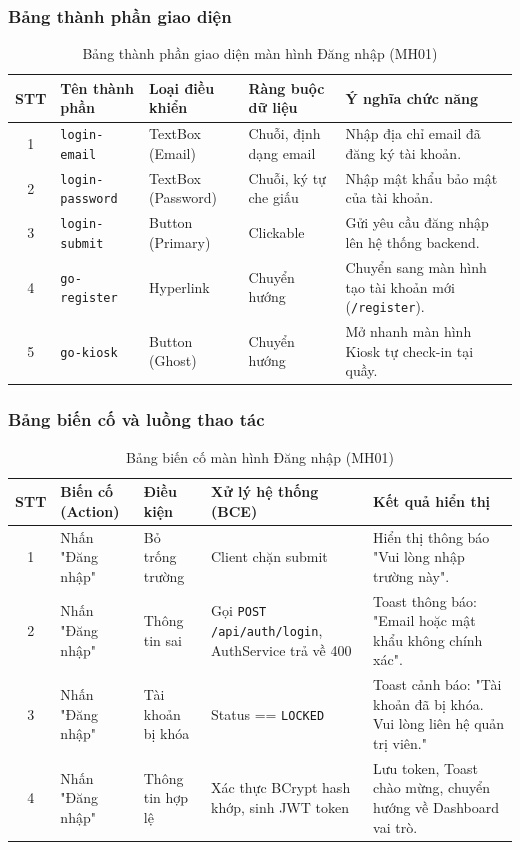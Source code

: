 \documentclass[12pt,a4paper]{report}
\begin{document}
\subsubsection{Bảng thành phần giao diện}
\begin{table}[H]
\centering
\small
\begin{tabularx}{\textwidth}{|c|l|l|l|X|}
\hline
\textbf{STT} & \textbf{Tên thành phần} & \textbf{Loại điều khiển} & \textbf{Ràng buộc dữ liệu} & \textbf{Ý nghĩa chức năng} \\ \hline
1 & \texttt{login-email} & TextBox (Email) & Chuỗi, định dạng email & Nhập địa chỉ email đã đăng ký tài khoản. \\ \hline
2 & \texttt{login-password} & TextBox (Password) & Chuỗi, ký tự che giấu & Nhập mật khẩu bảo mật của tài khoản. \\ \hline
3 & \texttt{login-submit} & Button (Primary) & Clickable & Gửi yêu cầu đăng nhập lên hệ thống backend. \\ \hline
4 & \texttt{go-register} & Hyperlink & Chuyển hướng & Chuyển sang màn hình tạo tài khoản mới (\texttt{/register}). \\ \hline
5 & \texttt{go-kiosk} & Button (Ghost) & Chuyển hướng & Mở nhanh màn hình Kiosk tự check-in tại quầy. \\ \hline
\end{tabularx}
\caption{Bảng thành phần giao diện màn hình Đăng nhập (MH01)}
\end{table}

\subsubsection{Bảng biến cố và luồng thao tác}
\begin{table}[H]
\centering
\small
\begin{tabularx}{\textwidth}{|c|l|l|X|X|}
\hline
\textbf{STT} & \textbf{Biến cố (Action)} & \textbf{Điều kiện} & \textbf{Xử lý hệ thống (BCE)} & \textbf{Kết quả hiển thị} \\ \hline
1 & Nhấn "Đăng nhập" & Bỏ trống trường & Client chặn submit & Hiển thị thông báo "Vui lòng nhập trường này". \\ \hline
2 & Nhấn "Đăng nhập" & Thông tin sai & Gọi \texttt{POST /api/auth/login}, AuthService trả về 400 & Toast thông báo: "Email hoặc mật khẩu không chính xác". \\ \hline
3 & Nhấn "Đăng nhập" & Tài khoản bị khóa & Status == \texttt{LOCKED} & Toast cảnh báo: "Tài khoản đã bị khóa. Vui lòng liên hệ quản trị viên." \\ \hline
4 & Nhấn "Đăng nhập" & Thông tin hợp lệ & Xác thực BCrypt hash khớp, sinh JWT token & Lưu token, Toast chào mừng, chuyển hướng về Dashboard vai trò. \\ \hline
\end{tabularx}
\caption{Bảng biến cố màn hình Đăng nhập (MH01)}
\end{table}
\end{document}
